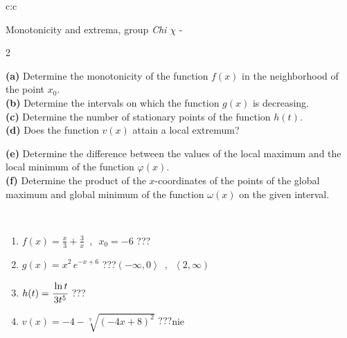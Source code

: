 \documentclass[10pt]{report}
\begin{document}
\begin{tabular}{c:c}
\begin{minipage}[c][104.5mm][t]{0.5\linewidth}
\begin{center}
\vspace{5mm}
{\huge Monotonicity and extrema, group \textit{Chi $\chi$} -}\\[5mm]
\begin{minipage}{0.95\linewidth}
\begin{center}
{\small \begin{multicols}{2} \raggedright
\textbf{(a)} Determine the monotonicity of the function \(f(x)\) in the neighborhood of the point \(x_0\). \\[1mm]
\textbf{(b)} Determine the intervals on which the function \(g(x)\) is decreasing. \\[1mm]
\textbf{(c)} Determine the number of stationary points of the function \(h(t)\). \\[1mm]
\textbf{(d)} Does the function \(v(x)\) attain a local extremum? \par \columnbreak
\textbf{(e)} Determine the difference between the values of the local maximum and the local minimum of the function \(\varphi(x)\). \\[1mm]
\textbf{(f)} Determine the product of the \(x\)-coordinates of the points of the global maximum and global minimum of the function \(\omega(x)\) on the given interval. \\[1mm]
\end{multicols}
}
\end{center}
\end{minipage}
\\[1mm]
\begin{minipage}{0.79\linewidth}
\begin{center}
\begin{varwidth}{\linewidth}
\setlength{\itemsep}{0pt}
\begin{enumerate}
\normalsize
\item $f(x)=\frac{x}{3}+\frac{3}{x} \enspace , \enspace x_0=-6$\quad \dotfill\; ???\;\dotfill \quad {}
\item $g(x)=x^2\, e^{-x+6}$\quad \dotfill\; ???\;\dotfill \quad $\left(-\infty , 0\right\rangle\enspace , \enspace \left\langle2 , \infty\right)$
\item $h(t)=\cfrac{\ln t}{3t^5}$\quad \dotfill\; ???\;\dotfill {}
\item $v(x)=-4-\sqrt[7]{(-4x+8)^2}$\quad \dotfill\; ???\;\dotfill \quad $\text{nie}$

\end{enumerate}
\end{varwidth}
\end{center}
\end{minipage}
\end{center}
\end{minipage}
\end{tabular}
\end{document}
